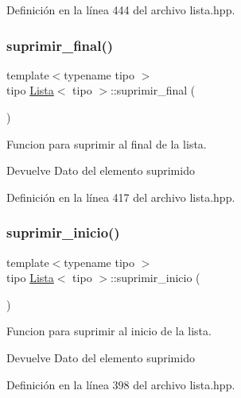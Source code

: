 Definición en la línea 444 del archivo lista.\+hpp.

\mbox{\label{classLista_aa23f3bd8ec8de6a913cc9cd876ef82b6}} 
\subsubsection{\texorpdfstring{suprimir\+\_\+final()}{suprimir\_final()}}
{\footnotesize\ttfamily template$<$typename tipo $>$ \\
tipo \hyperlink{classLista}{Lista}$<$ tipo $>$\+::suprimir\+\_\+final (\begin{DoxyParamCaption}{ }\end{DoxyParamCaption})}



Funcion para suprimir al final de la lista. 

\begin{DoxyReturn}{Devuelve}
Dato del elemento suprimido 
\end{DoxyReturn}


Definición en la línea 417 del archivo lista.\+hpp.

\mbox{\label{classLista_aa945bc96acdaeaefb3b9180f05539142}} 
\subsubsection{\texorpdfstring{suprimir\+\_\+inicio()}{suprimir\_inicio()}}
{\footnotesize\ttfamily template$<$typename tipo $>$ \\
tipo \hyperlink{classLista}{Lista}$<$ tipo $>$\+::suprimir\+\_\+inicio (\begin{DoxyParamCaption}{ }\end{DoxyParamCaption})}



Funcion para suprimir al inicio de la lista. 

\begin{DoxyReturn}{Devuelve}
Dato del elemento suprimido 
\end{DoxyReturn}


Definición en la línea 398 del archivo lista.\+hpp.

\mbox{\label{classLista_ab425ba6e39a83df96a56ef6d58bce951}} 
